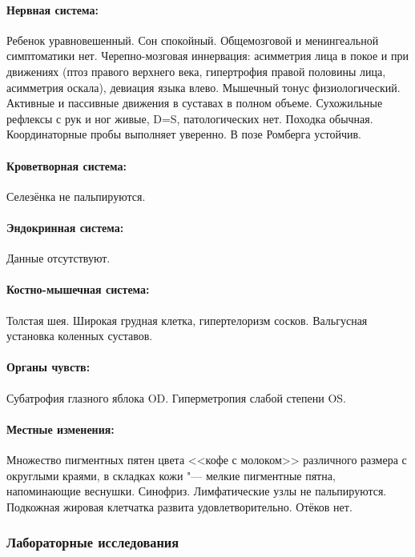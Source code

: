 \documentclass[a4paper,14pt]{extarticle}
\begin{document}
\paragraph{Нервная система:} Ребенок уравновешенный. Сон спокойный. Общемозговой и менингеальной симптоматики нет. Черепно\hyp{}мозговая иннервация: асимметрия лица в покое и при движениях (птоз правого верхнего века, гипертрофия правой половины лица, асимметрия оскала), девиация языка влево. Мышечный тонус физиологический. Активные и пассивные движения в суставах в полном объеме. Сухожильные рефлексы с рук и ног живые, D=S, патологических нет. Походка обычная. Координаторные пробы выполняет уверенно. В позе Ромберга устойчив. 

\paragraph{Кроветворная система:} Селезёнка не пальпируются.

\paragraph{Эндокринная система:} Данные отсутствуют.

\paragraph{Костно-мышечная система:} Толстая шея. Широкая грудная клетка, гипертелоризм сосков. Вальгусная установка коленных суставов. 

\paragraph{Органы чувств:} Субатрофия глазного яблока OD. Гиперметропия слабой степени OS.

\paragraph{Местные изменения:} Множество пигментных пятен цвета <<кофе с молоком>> различного размера с округлыми краями, в складках кожи "--- мелкие пигментные пятна, напоминающие веснушки. Синофриз. Лимфатические узлы не пальпируются. Подкожная жировая клетчатка развита удовлетворительно. Отёков нет.

\subsubsection*{Лабораторные исследования}
\end{document}
